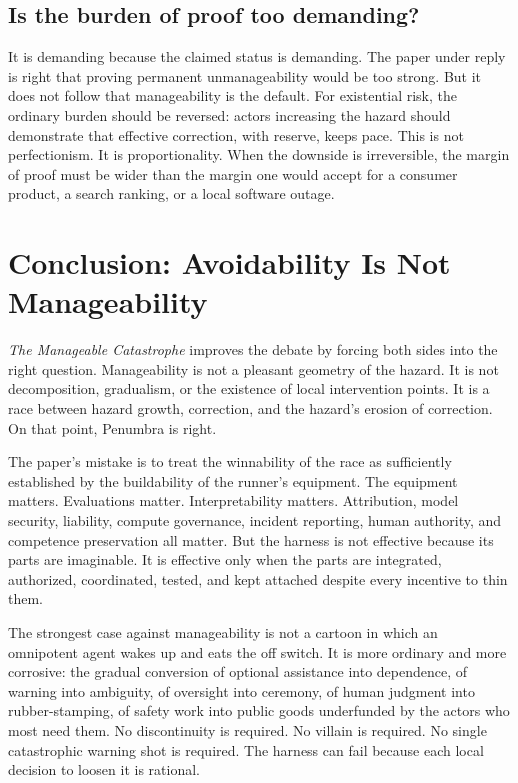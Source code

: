 \documentclass[11pt]{article}
\begin{document}
\subsection{Is the burden of proof too demanding?}

It is demanding because the claimed status is demanding. The paper under reply is right that proving permanent unmanageability would be too strong. But it does not follow that manageability is the default. For existential risk, the ordinary burden should be reversed: actors increasing the hazard should demonstrate that effective correction, with reserve, keeps pace. This is not perfectionism. It is proportionality. When the downside is irreversible, the margin of proof must be wider than the margin one would accept for a consumer product, a search ranking, or a local software outage.

\section{Conclusion: Avoidability Is Not Manageability}
\label{sec:conclusion}

\textit{The Manageable Catastrophe} improves the debate by forcing both sides into the right question. Manageability is not a pleasant geometry of the hazard. It is not decomposition, gradualism, or the existence of local intervention points. It is a race between hazard growth, correction, and the hazard's erosion of correction. On that point, Penumbra is right.

The paper's mistake is to treat the winnability of the race as sufficiently established by the buildability of the runner's equipment. The equipment matters. Evaluations matter. Interpretability matters. Attribution, model security, liability, compute governance, incident reporting, human authority, and competence preservation all matter. But the harness is not effective because its parts are imaginable. It is effective only when the parts are integrated, authorized, coordinated, tested, and kept attached despite every incentive to thin them.

The strongest case against manageability is not a cartoon in which an omnipotent agent wakes up and eats the off switch. It is more ordinary and more corrosive: the gradual conversion of optional assistance into dependence, of warning into ambiguity, of oversight into ceremony, of human judgment into rubber-stamping, of safety work into public goods underfunded by the actors who most need them. No discontinuity is required. No villain is required. No single catastrophic warning shot is required. The harness can fail because each local decision to loosen it is rational.
\end{document}
